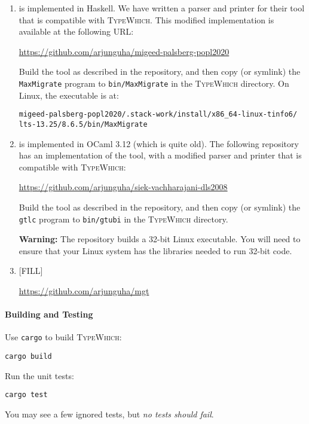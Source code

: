 \documentclass{article}
\newcommand{\system}{\textsc{TypeWhich}\xspace}
\begin{document}
\begin{enumerate}

\item \citet{migeed:decidable} is implemented in Haskell. We have written a
parser and printer for their tool that is compatible with \system. This
modified implementation is available at the following URL:

\url{https://github.com/arjunguha/migeed-palsberg-popl2020}

Build the tool as described in the repository, and then copy (or symlink) the
\texttt{MaxMigrate} program to \texttt{bin/MaxMigrate} in the \system
directory. On Linux, the executable is at:

\begin{verbatim}
migeed-palsberg-popl2020/.stack-work/install/x86_64-linux-tinfo6/
lts-13.25/8.6.5/bin/MaxMigrate
\end{verbatim}

\item \citet{siek:gti} is implemented in OCaml 3.12 (which is quite old).
The following repository has an implementation of the tool, with a modified
parser and printer that is compatible with \system:

\url{https://github.com/arjunguha/siek-vachharajani-dls2008}

Build the tool as described in the repository, and then copy (or symlink)
the \texttt{gtlc} program to \texttt{bin/gtubi} in the \system directory.

\textbf{Warning:} The repository builds a 32-bit Linux executable. You will
need to ensure that your Linux system has the libraries needed to run 32-bit
code.

\item \citet{campora:migrating} [FILL]
   
   \url{https://github.com/arjunguha/mgt}

\end{enumerate}

\paragraph{Building and Testing}

Use \texttt{cargo} to build \system:

\begin{verbatim}
cargo build
\end{verbatim}

Run the unit tests:
\begin{verbatim}
cargo test
\end{verbatim}
You may see a few ignored tests, but \emph{no tests should fail}.
\end{document}
